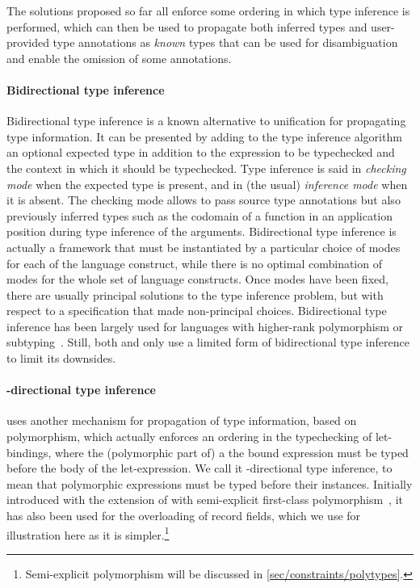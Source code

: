 \documentclass[acmsmall,screen,nonacm]{acmart}
\begin{document}
The solutions proposed so far all enforce some ordering in which type
inference is performed, which can then be used to propagate both inferred
types and user-provided type annotations as \emph{known} types that can be
used for disambiguation and enable the omission of some annotations.

\paragraph{Bidirectional type inference}

Bidirectional type inference is a known alternative to unification for
propagating type information. It can be presented by adding to the type
inference algorithm an optional expected type in addition to the expression
to be typechecked and the context in which it should be typechecked.  Type
inference is said in \emph{checking mode} when the expected type is present,
and in (the usual) \emph{inference mode} when it is absent. The checking
mode allows to pass source type annotations but also previously inferred
types such as the codomain of a function in an application position during
type inference of the arguments.
%
Bidirectional type inference is actually a framework that must be
instantiated by a particular choice of modes for each of the language
construct, while there is no optimal combination of modes for the whole set
of language constructs. Once modes have been fixed, there are usually
principal solutions to the type inference problem, but with respect to a
specification that made non-principal choices.
%
Bidirectional type inference has been largely used for languages with
higher-rank polymorphism or subtyping~. Still, both \OCaml
and \Haskell only use a limited form of bidirectional type inference to
limit its downsides.


\paragraph{\Geninst-directional type inference}
\OCaml uses another mechanism for propagation of type information,
based on polymorphism, which actually enforces an ordering in the
typechecking of let-bindings, where the (polymorphic part of) a the
bound expression must be typed before the body of the let-expression.
We call it \textbf{\geninst}-directional type inference, to mean that
polymorphic expressions must be typed before their
instances.  Initially introduced with the extension of \ML with
semi-explicit first-class polymorphism~\cite {Garrigue-Remy/poly-ml},
it has also been used for the overloading of record fields, which we
use for illustration here as it is simpler.\footnote {Semi-explicit
  polymorphism will be discussed in \cref{sec/constraints/polytypes}.}
\end{document}
